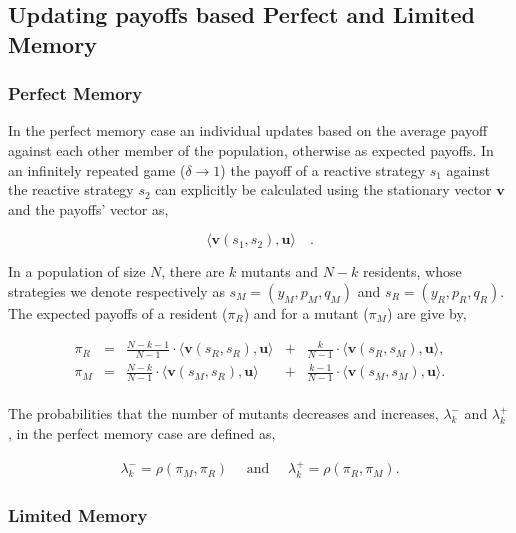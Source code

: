 \documentclass[11pt]{article}
\theoremstyle{plainCl1}
\theoremstyle{plainCl2}
\begin{document}
\subsection{Updating payoffs based Perfect and Limited Memory}

\subsubsection*{Perfect Memory}

In the perfect memory case an individual updates based on the average payoff
against each other member of the population, otherwise as expected payoffs. In
an infinitely repeated game ($\delta \rightarrow 1$) the payoff of a reactive
strategy \(s_1\) against the reactive strategy \(s_2\) can explicitly be
calculated using the stationary vector \(\mathbf{v}\) and the payoffs' vector as,

\[\langle\mathbf{v}(s_1,s_2),\mathbf{u}\rangle \quad.\]

In a population of size \(N\), there are \(k\) mutants and \(N - k\) residents,
whose strategies we denote respectively as \(s_M =(y_M, p_M, q_M)\) and \(s_R =
(y_R, p_R, q_R)\). The expected payoffs of a resident (\(\pi_R\)) and for a
mutant (\(\pi_M\)) are give by,

\begin{equation} \label{Eq:ExpPay}
  \begin{array}{lcrcr}
  \displaystyle \pi_R & = &\displaystyle \frac{N\!-\!k\!-\!1}{N-1}\cdot \langle\mathbf{v}(s_R,s_R),\mathbf{u}\rangle	&+	&\displaystyle\frac{k}{N-1}\cdot \langle\mathbf{v}(s_R,s_M),\mathbf{u}\rangle,\\[0.5cm]
  \displaystyle \pi_M & = &\displaystyle\frac{N-k}{N-1}\cdot \langle\mathbf{v}(s_M,s_R),\mathbf{u}\rangle&+	&\displaystyle\frac{k-1}{N-1}\cdot \langle\mathbf{v}(s_M,s_M),\mathbf{u}\rangle.\\
  \end{array}
\end{equation}

The probabilities that the number of mutants decreases and increases,
\(\lambda^-_k\) and \(\lambda^+_k\), in the perfect memory case are defined as,

\begin{align}
  \lambda^-_k \!=\!\rho(\pi_M, \pi_R) \quad \text{ and } \quad \lambda^+_k \!=\!\rho(\pi_R, \pi_M).
\end{align}

\subsubsection*{Limited Memory}
\end{document}

